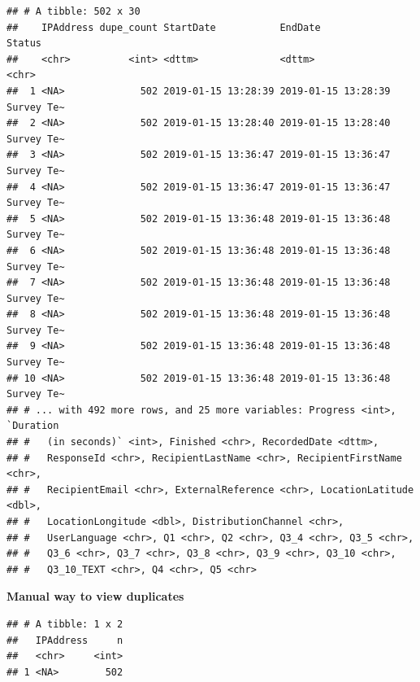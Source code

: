 \documentclass[]{book}
\newenvironment{Shaded}{\begin{snugshade}}{\end{snugshade}}
\newcommand{\KeywordTok}[1]{\textcolor[rgb]{0.13,0.29,0.53}{\textbf{#1}}}
\newcommand{\DecValTok}[1]{\textcolor[rgb]{0.00,0.00,0.81}{#1}}
\newcommand{\StringTok}[1]{\textcolor[rgb]{0.31,0.60,0.02}{#1}}
\newcommand{\CommentTok}[1]{\textcolor[rgb]{0.56,0.35,0.01}{\textit{#1}}}
\newcommand{\OperatorTok}[1]{\textcolor[rgb]{0.81,0.36,0.00}{\textbf{#1}}}
\newcommand{\NormalTok}[1]{#1}
\begin{document}
\begin{verbatim}
## # A tibble: 502 x 30
##    IPAddress dupe_count StartDate           EndDate             Status    
##    <chr>          <int> <dttm>              <dttm>              <chr>     
##  1 <NA>             502 2019-01-15 13:28:39 2019-01-15 13:28:39 Survey Te~
##  2 <NA>             502 2019-01-15 13:28:40 2019-01-15 13:28:40 Survey Te~
##  3 <NA>             502 2019-01-15 13:36:47 2019-01-15 13:36:47 Survey Te~
##  4 <NA>             502 2019-01-15 13:36:47 2019-01-15 13:36:47 Survey Te~
##  5 <NA>             502 2019-01-15 13:36:48 2019-01-15 13:36:48 Survey Te~
##  6 <NA>             502 2019-01-15 13:36:48 2019-01-15 13:36:48 Survey Te~
##  7 <NA>             502 2019-01-15 13:36:48 2019-01-15 13:36:48 Survey Te~
##  8 <NA>             502 2019-01-15 13:36:48 2019-01-15 13:36:48 Survey Te~
##  9 <NA>             502 2019-01-15 13:36:48 2019-01-15 13:36:48 Survey Te~
## 10 <NA>             502 2019-01-15 13:36:48 2019-01-15 13:36:48 Survey Te~
## # ... with 492 more rows, and 25 more variables: Progress <int>, `Duration
## #   (in seconds)` <int>, Finished <chr>, RecordedDate <dttm>,
## #   ResponseId <chr>, RecipientLastName <chr>, RecipientFirstName <chr>,
## #   RecipientEmail <chr>, ExternalReference <chr>, LocationLatitude <dbl>,
## #   LocationLongitude <dbl>, DistributionChannel <chr>,
## #   UserLanguage <chr>, Q1 <chr>, Q2 <chr>, Q3_4 <chr>, Q3_5 <chr>,
## #   Q3_6 <chr>, Q3_7 <chr>, Q3_8 <chr>, Q3_9 <chr>, Q3_10 <chr>,
## #   Q3_10_TEXT <chr>, Q4 <chr>, Q5 <chr>
\end{verbatim}

\textbf{Manual way to view duplicates}

\begin{Shaded}
\end{Shaded}

\begin{verbatim}
## # A tibble: 1 x 2
##   IPAddress     n
##   <chr>     <int>
## 1 <NA>        502
\end{verbatim}
\end{document}
